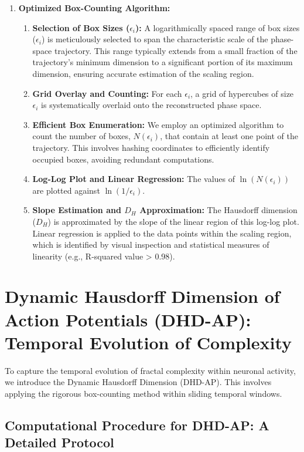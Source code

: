 \documentclass{article}
\begin{document}
\begin{enumerate}
    \item \textbf{Optimized Box-Counting Algorithm:}
    \begin{enumerate}
        \item \textbf{Selection of Box Sizes ($\epsilon_i$):} A logarithmically spaced range of box sizes ($\epsilon_i$) is meticulously selected to span the characteristic scale of the phase-space trajectory. This range typically extends from a small fraction of the trajectory's minimum dimension to a significant portion of its maximum dimension, ensuring accurate estimation of the scaling region.
        \item \textbf{Grid Overlay and Counting:} For each $\epsilon_i$, a grid of hypercubes of size $\epsilon_i$ is systematically overlaid onto the reconstructed phase space.
        \item \textbf{Efficient Box Enumeration:} We employ an optimized algorithm to count the number of boxes, $N(\epsilon_i)$, that contain at least one point of the trajectory. This involves hashing coordinates to efficiently identify occupied boxes, avoiding redundant computations.
        \item \textbf{Log-Log Plot and Linear Regression:} The values of $\ln(N(\epsilon_i))$ are plotted against $\ln(1/\epsilon_i)$.
        \item \textbf{Slope Estimation and $D_H$ Approximation:} The Hausdorff dimension ($D_H$) is approximated by the slope of the linear region of this log-log plot. Linear regression is applied to the data points within the scaling region, which is identified by visual inspection and statistical measures of linearity (e.g., R-squared value > 0.98).
    \end{enumerate}
\end{enumerate}

\section{Dynamic Hausdorff Dimension of Action Potentials (DHD-AP): Temporal Evolution of Complexity}

To capture the temporal evolution of fractal complexity within neuronal activity, we introduce the Dynamic Hausdorff Dimension (DHD-AP). This involves applying the rigorous box-counting method within sliding temporal windows.

\subsection{Computational Procedure for DHD-AP: A Detailed Protocol}
\end{document}
